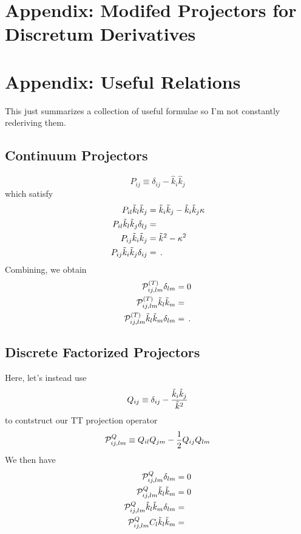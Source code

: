 \documentclass{revtex4}
\begin{document}
\section{Appendix: Modifed Projectors for Discretum Derivatives}

\section{Appendix: Useful Relations}
This just summarizes a collection of useful formulae so I'm not constantly rederiving them.

\subsection{Continuum Projectors}
\begin{equation}
  P_{ij} \equiv \delta_{ij} - \hat{k}_i\hat{k}_j
\end{equation}
which satisfy
\begin{subequations}
\begin{align}
  P_{il}\tilde{k}_l\tilde{k}_j &= \tilde{k}_i\tilde{k}_j - \hat{k}_i\tilde{k}_j\kappa \\
  P_{il}\tilde{k}_l\tilde{k}_j\delta_{lj} &= \\
  P_{ij}\tilde{k}_i\tilde{k}_j &= \tilde{k}^2 - \kappa^2 \\
  P_{ij}\tilde{k}_i\tilde{k}_j\delta_{ij} &= \, .
\end{align}
\end{subequations}
Combining, we obtain
\begin{subequations}
\begin{align}
  \mathcal{P}^{(T)}_{ij,lm}\delta_{lm} &= 0 \\
  \mathcal{P}^{(T)}_{ij,lm}\tilde{k}_l\tilde{k}_m &=  \\
  \mathcal{P}^{(T)}_{ij,lm}\tilde{k}_l\tilde{k}_m\delta_{lm} &= \, .
\end{align}
\end{subequations}

\subsection{Discrete Factorized Projectors}
Here, let's instead use
\begin{equation}
  Q_{ij} \equiv \delta_{ij} - \frac{\tilde{k}_i\tilde{k}_j}{\tilde{k}^2}
\end{equation}
to contstruct our TT projection operator
\begin{equation}
  \mathcal{P}^Q_{ij,lm} \equiv Q_{il}Q_{jm} - \frac{1}{2}Q_{ij}Q_{lm}
\end{equation}
We then have
\begin{subequations}
\begin{align}
  \mathcal{P}^Q_{ij,lm}\delta_{lm} &= 0 \\
  \mathcal{P}^Q_{ij,lm}\tilde{k}_l\tilde{k}_m &= 0 \\
  \mathcal{P}^Q_{ij,lm}\tilde{k}_l\tilde{k}_m\delta_{lm} &= \\
  \mathcal{P}^Q_{ij,lm}C_l\tilde{k}_l\tilde{k}_m &= 
\end{align}
\end{subequations}
\end{document}
